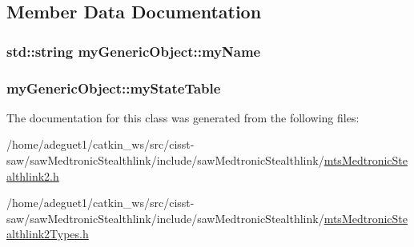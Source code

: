 \subsection{Member Data Documentation}
\hypertarget{classmy_generic_object_a092bc6bd9475d195b79eaf1c2976c26d}{
\subsubsection[{my\-Name}]{\setlength{\rightskip}{0pt plus 5cm}std\-::string my\-Generic\-Object\-::my\-Name\hspace{0.3cm}{\ttfamily [protected]}}}\label{classmy_generic_object_a092bc6bd9475d195b79eaf1c2976c26d}
\hypertarget{classmy_generic_object_a5c06baaecad1a458908d7955576c15b2}{
\subsubsection[{my\-State\-Table}]{ my\-Generic\-Object\-::my\-State\-Table\hspace{0.3cm}{\ttfamily [protected]}}}\label{classmy_generic_object_a5c06baaecad1a458908d7955576c15b2}


The documentation for this class was generated from the following files\-:\begin{DoxyCompactItemize}
\item 
/home/adeguet1/catkin\-\_\-ws/src/cisst-\/saw/saw\-Medtronic\-Stealthlink/include/saw\-Medtronic\-Stealthlink/\hyperlink{mts_medtronic_stealthlink2_8h}{mts\-Medtronic\-Stealthlink2.\-h}\item 
/home/adeguet1/catkin\-\_\-ws/src/cisst-\/saw/saw\-Medtronic\-Stealthlink/include/saw\-Medtronic\-Stealthlink/\hyperlink{mts_medtronic_stealthlink2_types_8h}{mts\-Medtronic\-Stealthlink2\-Types.\-h}\end{DoxyCompactItemize}
